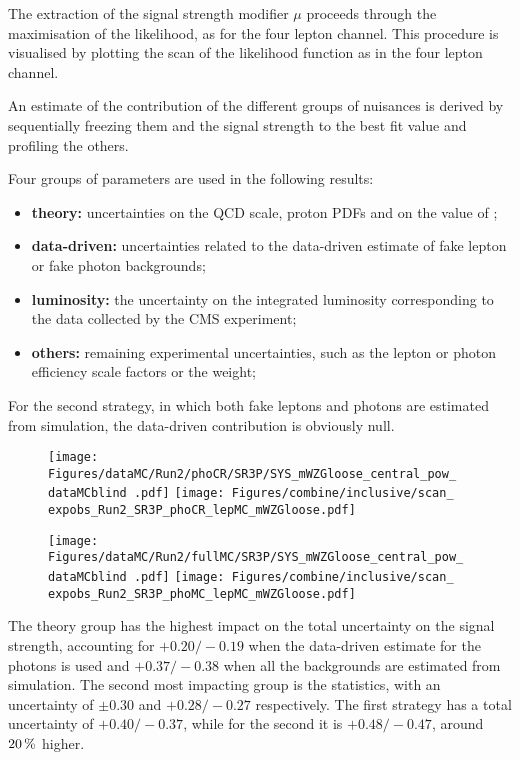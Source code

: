 The extraction of the signal strength modifier $\mu$ proceeds through the maximisation of the likelihood,
as for the four lepton channel.
This procedure is visualised by plotting the scan of the likelihood function as in the four lepton channel.

An estimate of the contribution of the different groups of nuisances is derived
by sequentially freezing them and the signal strength to the best fit value
and profiling the others.

Four groups of parameters are used in the following results:
\begin{itemize}
\item \textbf{theory:} uncertainties on the QCD scale, proton PDFs and on the value of \alpS;
\item \textbf{data-driven:} uncertainties related to the data-driven estimate of fake lepton or fake photon backgrounds;
\item \textbf{luminosity:} the uncertainty on the integrated luminosity corresponding to the data collected by the CMS experiment;
\item \textbf{others:} remaining experimental uncertainties, such as the lepton or photon efficiency scale factors or the \pileup{} weight;
\end{itemize}

For the second strategy, in which both fake leptons and photons are estimated from simulation,
the data-driven contribution is obviously null.

\begin{figure}
  \centering
  \texttt{[image: Figures/dataMC/Run2/phoCR/SR3P/SYS\_mWZGloose\_central\_pow\_\\dataMCblind .pdf]}
  \hfill
  \texttt{[image: Figures/combine/inclusive/scan\_\\expobs\_Run2\_SR3P\_phoCR\_lepMC\_mWZGloose.pdf]}
  \caption{}
  \label{fig:scan_Run2_SR3P_phoCR_lepMC_mWZGloose}
\end{figure}

\begin{figure}
  \centering
  \texttt{[image: Figures/dataMC/Run2/fullMC/SR3P/SYS\_mWZGloose\_central\_pow\_\\dataMCblind .pdf]}
  \hfill
  \texttt{[image: Figures/combine/inclusive/scan\_\\expobs\_Run2\_SR3P\_phoMC\_lepMC\_mWZGloose.pdf]}
  \caption{}
  \label{fig:scan_Run2_SR4P_phoMC_lepMC_mWZGloose}
\end{figure}

The theory group has the highest impact on the total uncertainty on the signal strength,
accounting for $+0.20/-0.19$ when the data-driven estimate for the \nonprompt photons is used
and $+0.37/-0.38$ when all the backgrounds are estimated from simulation.
The second most impacting group is the statistics, with an uncertainty of
$\pm 0.30$ and $+0.28/-0.27$ respectively.
The first strategy has a total uncertainty of $+0.40/-0.37$,
while for the second it is $+0.48/-0.47$,
around $20\usep\%$ higher.
